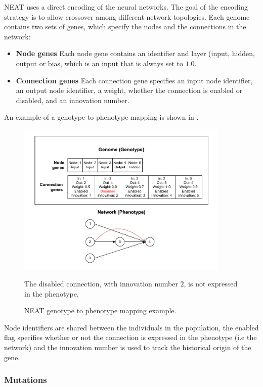 NEAT uses a direct encoding of the neural networks. The goal of the encoding strategy is to allow crossover among different network topologies.
Each genome contains two sets of genes, which specify the nodes and the connections in the network:

\begin{itemize}
    \item \textbf{Node genes} Each node gene contains an identifier and layer (input, hidden, output or bias, which is an input that is always set to $1.0$.
    \item \textbf{Connection genes} Each connection gene specifies an input node identifier, an output node identifier, a weight, whether the connection is enabled or
        disabled, and an innovation number.
\end{itemize}

An example of a genotype to phenotype mapping is shown in .

\begin{figure}
    \centering
    \includegraphics[width=0.9\textwidth]{Pictures/neat_encoding}
    \caption{NEAT genotype to phenotype mapping example.}{The disabled connection, with innovation number $2$, is not expressed in the phenotype.}
    \label{fig:neat_genome}
\end{figure}

Node identifiers are shared between the individuals in the population, the enabled flag specifies whether or not the connection is expressed in the phenotype (i.e
the network) and the innovation number is used to track the historical origin of the gene.

\subsubsection{Mutations}

